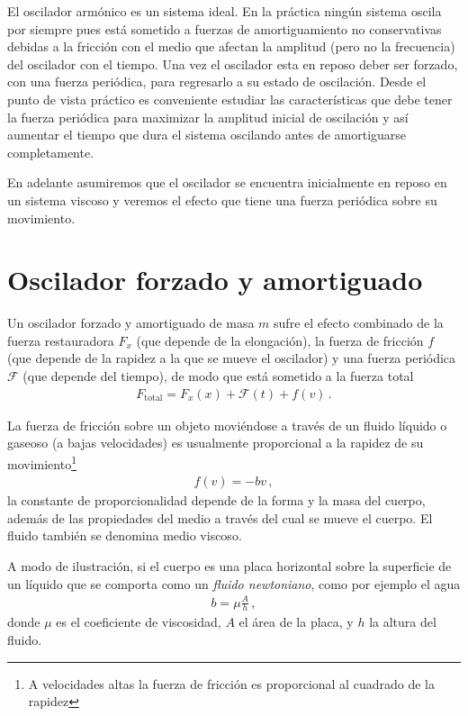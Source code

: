 El oscilador armónico es un sistema ideal. En la práctica ningún sistema oscila por siempre pues está sometido a fuerzas de amortiguamiento no conservativas debidas a la fricción con el medio que afectan la amplitud (pero no la frecuencia) del oscilador con el tiempo. Una vez el oscilador esta en reposo deber ser forzado, con una fuerza periódica, para regresarlo a su estado de oscilación. Desde el punto de vista práctico es conveniente estudiar las características que debe tener la fuerza periódica para maximizar la amplitud inicial de oscilación y así aumentar el tiempo que dura el sistema oscilando antes de amortiguarse completamente. 

En adelante asumiremos que el oscilador se encuentra inicialmente en reposo en un sistema viscoso y veremos el efecto que tiene una fuerza periódica sobre su movimiento.

\section{Oscilador forzado y amortiguado}
Un oscilador forzado y amortiguado de masa $m$ sufre el efecto combinado de la fuerza restauradora $F_x$ (que depende de la elongación), la fuerza de fricción $f$ (que depende de la rapidez a la que se mueve el oscilador) y una fuerza periódica $\mathcal{F}$ (que depende del tiempo), de modo que está sometido a la fuerza total
\begin{align*}
  F_{\text{total}}=F_x(x)+\mathcal{F}(t)+f(v)\,.
\end{align*}

La fuerza de fricción sobre un objeto moviéndose a través de un fluido líquido o gaseoso  (a bajas velocidades) es usualmente proporcional a la rapidez de su movimiento\footnote{A velocidades altas la fuerza de fricción es proporcional al cuadrado de la rapidez}
\begin{align*}
  f(v)=-b v\,,
\end{align*}
la constante de proporcionalidad depende de la forma y la masa del cuerpo, además de las propiedades del medio a través del cual se mueve el cuerpo. 
El fluido también se denomina medio viscoso. 

A modo de ilustración, si el cuerpo es una placa horizontal sobre la superficie de un líquido que se comporta como un \emph{fluido newtoniano}, como por ejemplo el agua
\begin{align*}
  b=\mu\frac{A}{h}\,,
\end{align*}
donde $\mu$ es el coeficiente de viscosidad, $A$ el área de la placa, y $h$ la altura del fluido.

